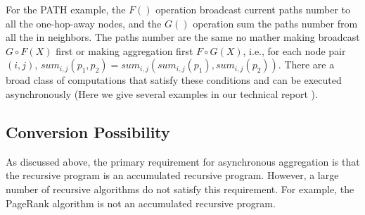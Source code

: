
\begin{comment}
<<<<<<< HEAD
For the SSSP example, the $F()$ operation expands the BFS searching scope to one-hop-away nodes, and the $G()$ operation picks the minimal distance resulted from the shortest path. The shortest distances are the same no matter making expansion first $G\circ F(X)$ or making aggregation first $F\circ G(X)$, i.e., for each node $j$, $min_j(d_j+w)=min_j(min_j(d_j)+w)$. There are a broad class of computations that satisfy these conditions and can be executed asynchronously (Here we give several examples in Appendix Sec. \ref{sec:app:example}).
=======
\end{comment}
For the PATH example, the $F()$ operation broadcast current paths number to all the one-hop-away nodes, and the $G()$ operation sum the paths number from all the in neighbors. The paths number are the same no mather making broadcast $G\circ F(X)$ first or making aggregation first $F\circ G(X)$, i.e., for each node pair $(i,j)$, $sum_{i,j}(p_1,p_2)= sum_{i,j}(sum_{i,j}(p_1),sum_{i,j}(p_2))$. There are a broad class of computations that satisfy these conditions and can be executed asynchronously (Here we give several examples in our technical report \cite{fullversion}).


\subsection{Conversion Possibility}
\label{sec:async:convert}
\begin{comment}
<<<<<<< HEAD
Some non-monotonic computations cannot be written as accumulated recursive program and are not originally qualified for asynchronous aggregation. For example, the PageRank computation cannot be executed as an accumulated recursive program since the monotonic condition is not satisfied. After applying $F\circ G$ operations, the recursion result $X^{k}$ is replaced by $X^{k+1}$ but not contained in $X^{k+1}$. In other words, there is no incremental computing relationship between $X^k$ and $X^{k-1}$. Further, the aggregate operation $g(\{x_i\})=\sum_i{x_i}+0.15$ does not have the accumulative property due to the additional constant $0.15$.

Fortunately, Some of these computations can be converted to accumulative recursive aggregation.The key of the conversion is to incrementally computing the original problem $X^k=(G\circ F)^n(X^0)$ and iteratively computing the incremental value $\Delta X^k$ of each recursion using normal recursive aggregation. i.e.,
=======
\end{comment}
As discussed above, the primary requirement for asynchronous aggregation is that the recursive program is an accumulated recursive program. However, a large number of recursive algorithms do not satisfy this requirement. For example, the PageRank algorithm is not an accumulated recursive program.

